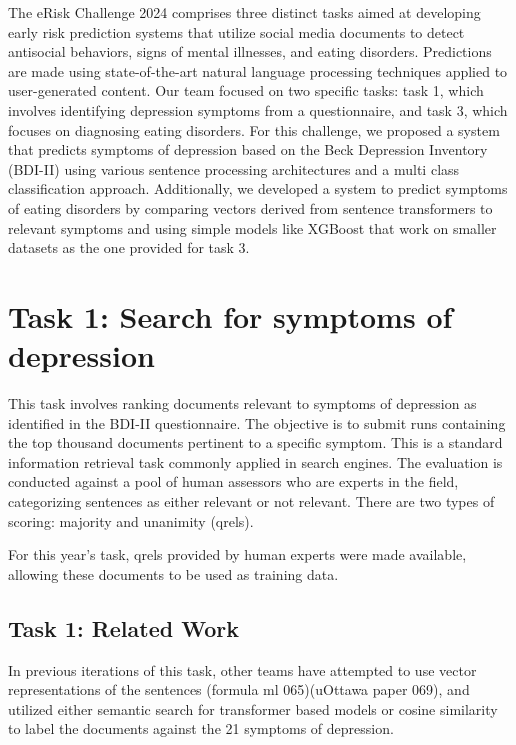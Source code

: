 \documentclass[]{style/ceurart}
\begin{document}
The eRisk Challenge 2024 comprises three distinct tasks aimed at developing early risk prediction systems that utilize social media documents to detect antisocial behaviors, signs of mental illnesses, and eating disorders. Predictions are made using state-of-the-art natural language processing techniques applied to user-generated content. Our team focused on two specific tasks: task 1, which involves identifying depression symptoms from a questionnaire, and task 3, which focuses on diagnosing eating disorders. For this challenge, we proposed a system that predicts symptoms of depression based on the Beck Depression Inventory (BDI-II) using various sentence processing architectures and a multi class classification approach. Additionally, we developed a system to predict symptoms of eating disorders by comparing vectors derived from sentence transformers to relevant symptoms and using simple models like XGBoost that work on smaller datasets as the one provided for task 3.



\section{Task 1: Search for symptoms of depression}

This task involves ranking documents relevant to symptoms of depression as identified in the BDI-II questionnaire. The objective is to submit runs containing the top thousand documents pertinent to a specific symptom. This is a standard information retrieval task commonly applied in search engines. The evaluation is conducted against a pool of human assessors who are experts in the field, categorizing sentences as either relevant or not relevant. There are two types of scoring: majority and unanimity (qrels).

For this year's task, qrels provided by human experts were made available, allowing these documents to be used as training data.


\subsection{Task 1: Related Work}

In previous iterations of this task, other teams have attempted to use vector representations of the sentences (formula ml 065)(uOttawa paper 069), and utilized either semantic search for transformer based models or cosine similarity to label the documents against the 21 symptoms of depression.
\end{document}
